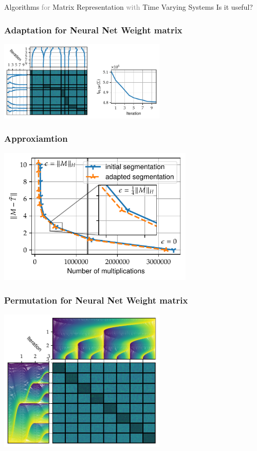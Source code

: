 \documentclass{beamer}
\newcommand{\chapterpage}[1]{
	{\small 
	\textcolor{tumcolor-blue}{Algorithms} 
	\textcolor{gray}{for} 
	\textcolor{tumcolor-blue}{Matrix Representation} 
	\textcolor{gray}{with} 
	\textcolor{tumcolor-blue}{Time Varying Systems}
}
\newline
\phantom{\Huge\emph{} H}
\newline
{\LARGE \textcolor{tumcolor-blue}{#1}}
}
\begin{document}
\begin{frame}
	\chapterpage{Is it useful?}
\end{frame}

\begin{frame}
	\frametitle{Adaptation for Neural Net Weight matrix}
	\centering
	\includegraphics[trim=0cm 0cm 6cm 0cm, clip,width=0.6\textwidth]{../Thesis/Plots/move_example_mobilenet_comp.pdf}
\end{frame}

\begin{frame}
	\frametitle{Approxiamtion}
	\centering
	\includegraphics[width=0.7\textwidth]{../Thesis/Plots/move_example_mobilenet_error.pdf}
\end{frame}

\begin{frame}
	\frametitle{Permutation for Neural Net Weight matrix}
	\centering
	\includegraphics[width=0.6\textwidth]{../Thesis/Plots/Mobilenet_permute.pdf}
\end{frame}
\end{document}
